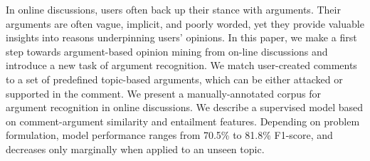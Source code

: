 In online discussions, users often back up their stance with arguments. Their arguments are often vague, implicit, and poorly worded, yet they provide valuable insights into reasons underpinning users' opinions. In this paper, we make a first step towards argument-based opinion mining from on-line discussions and introduce a new task of argument recognition. We match user-created comments to a set of predefined topic-based arguments, which can be either attacked or supported in the comment. We present a manually-annotated corpus for argument recognition in online discussions. We describe a supervised model based on comment-argument similarity and entailment features. Depending on problem formulation, model performance ranges from 70.5\% to 81.8\% F1-score, and decreases only marginally when applied to an unseen topic.
